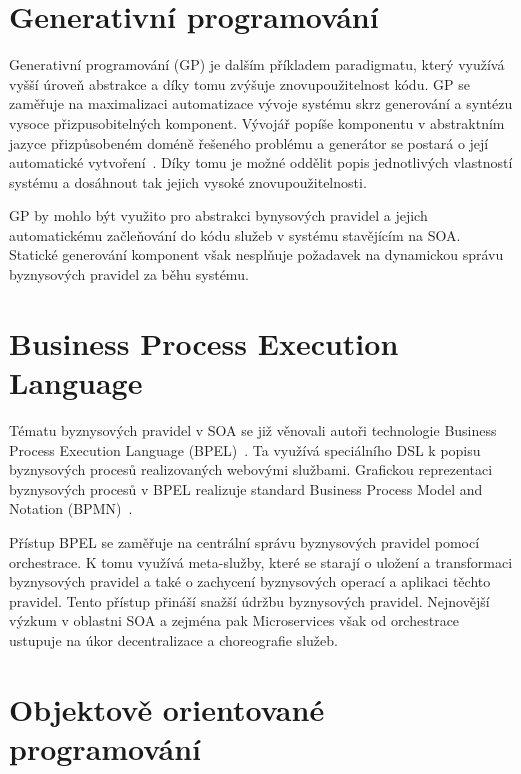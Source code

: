 \section{Generativní programování}

Generativní programování (\gls{GP}) je dalším příkladem paradigmatu, který
využívá vyšší úroveň abstrakce a díky tomu zvýšuje znovupoužitelnost
kódu. \gls{GP} se zaměřuje na maximalizaci automatizace vývoje systému
skrz generování a syntézu vysoce přizpusobitelných komponent. Vývojář
popíše komponentu v abstraktním jazyce přizpůsobeném doméně řešeného
problému a generátor se postará o její automatické vytvoření~\cite{czarnecki2000generative}.
Díky tomu je možné oddělit popis jednotlivých vlastností systému a dosáhnout tak
jejich vysoké znovupoužitelnosti.

\gls{GP} by mohlo být využito pro abstrakci bynysových pravidel a jejich automatickému
začleňování do kódu služeb v systému stavějícím na \gls{SOA}.
Statické generování komponent však nesplňuje požadavek na dynamickou správu
byznysových pravidel za běhu systému.

\section{Business Process Execution Language}

Tématu byznysových pravidel v \gls{SOA} se již věnovali autoři technologie Business Process Execution
Language (\gls{BPEL})~\cite{andrews2003business}. Ta využívá speciálního \gls{DSL} k popisu
byznysových procesů realizovaných webovými službami.
Grafickou reprezentaci byznysových procesů v \gls{BPEL} realizuje standard Business Process Model and Notation (\gls{BPMN})~\cite{model2011notation}.

Přístup \gls{BPEL} se zaměřuje na centrální správu byznysových pravidel pomocí orchestrace.
K tomu využívá meta-služby, které se starají o uložení a transformaci byznysových pravidel a také o
zachycení byznysových operací a aplikaci těchto pravidel. Tento přístup přináší snažší
údržbu byznysových pravidel. Nejnovější výzkum v oblastni \gls{SOA} a zejména pak Microservices
však od orchestrace ustupuje na úkor decentralizace a choreografie služeb.

\section{Objektově orientované programování}\label{sec:oop}

